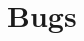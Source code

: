 \documentclass{book}
\begin{document}
   

        


        


    









    \appendix
    \appendixpage
      \chapter{Bugs}
      
\end{document}
